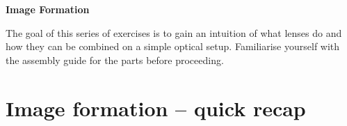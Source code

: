 \documentclass[a4paper]{report}
\begin{document}
	\setcounter{secnumdepth}{2}

	\begin{center}
		\textbf{\Large{Image Formation}}
	\end{center}

	\vspace{0.8cm}
	\noindent The goal of this series of exercises is to gain an intuition of what lenses do and how they can be combined on a simple optical setup.
    Familiarise yourself with the assembly guide for the parts before proceeding. 




	\section{Image formation -- quick recap}
	\hypertarget{hintBack-recap}{}
\end{document}
